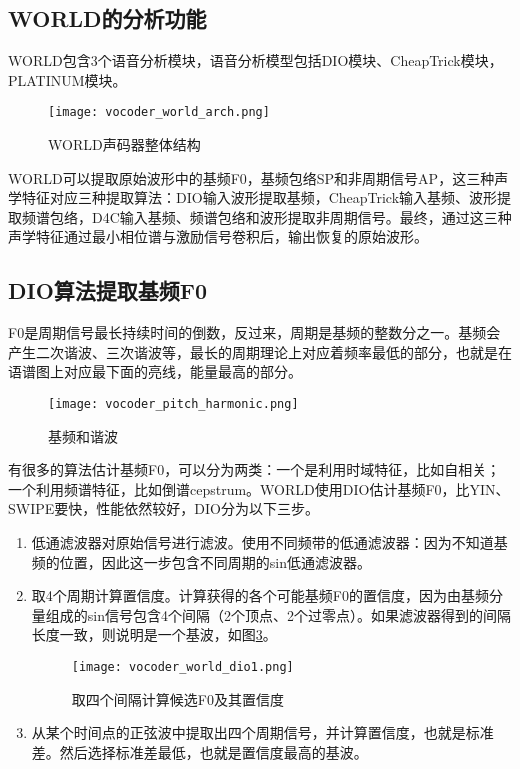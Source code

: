 \documentclass[cn,10pt,math=newtx,citestyle=gb7714-2015,bibstyle=gb7714-2015]{elegantbook}
\begin{document}
\subsection{WORLD的分析功能}

WORLD包含3个语音分析模块，语音分析模型包括DIO模块、CheapTrick模块，PLATINUM模块。

\begin{figure}[htbp]
  \centering
  \texttt{[image: vocoder\_world\_arch.png]}
  \caption{WORLD声码器整体结构 \label{fig:vocoder_world_arch}}
\end{figure}

WORLD可以提取原始波形中的基频F0，基频包络SP和非周期信号AP，这三种声学特征对应三种提取算法：DIO输入波形提取基频，CheapTrick输入基频、波形提取频谱包络，D4C输入基频、频谱包络和波形提取非周期信号。最终，通过这三种声学特征通过最小相位谱与激励信号卷积后，输出恢复的原始波形。

\subsection{DIO算法提取基频F0}

F0是周期信号最长持续时间的倒数，反过来，周期是基频的整数分之一。基频会产生二次谐波、三次谐波等，最长的周期理论上对应着频率最低的部分，也就是在语谱图上对应最下面的亮线，能量最高的部分。

\begin{figure}[htbp]
  \centering
  \texttt{[image: vocoder\_pitch\_harmonic.png]}
  \caption{基频和谐波 \label{fig:vocoder_pitch_harmonic}}
\end{figure}

有很多的算法估计基频F0，可以分为两类：一个是利用时域特征，比如自相关；一个利用频谱特征，比如倒谱cepstrum。WORLD使用DIO估计基频F0，比YIN、SWIPE要快，性能依然较好，DIO分为以下三步。

\begin{enumerate}
  \item 低通滤波器对原始信号进行滤波。使用不同频带的低通滤波器：因为不知道基频的位置，因此这一步包含不同周期的sin低通滤波器。
  
  \item 取4个周期计算置信度。计算获得的各个可能基频F0的置信度，因为由基频分量组成的sin信号包含4个间隔（2个顶点、2个过零点）。如果滤波器得到的间隔长度一致，则说明是一个基波，如图\ref{fig:vocoder_world_dio1}。
  
  \begin{figure}[htbp]
    \centering
    \texttt{[image: vocoder\_world\_dio1.png]}
    \caption{取四个间隔计算候选F0及其置信度 \label{fig:vocoder_world_dio1}}
  \end{figure}

  \item 从某个时间点的正弦波中提取出四个周期信号，并计算置信度，也就是标准差。然后选择标准差最低，也就是置信度最高的基波。
\end{enumerate}
\end{document}
